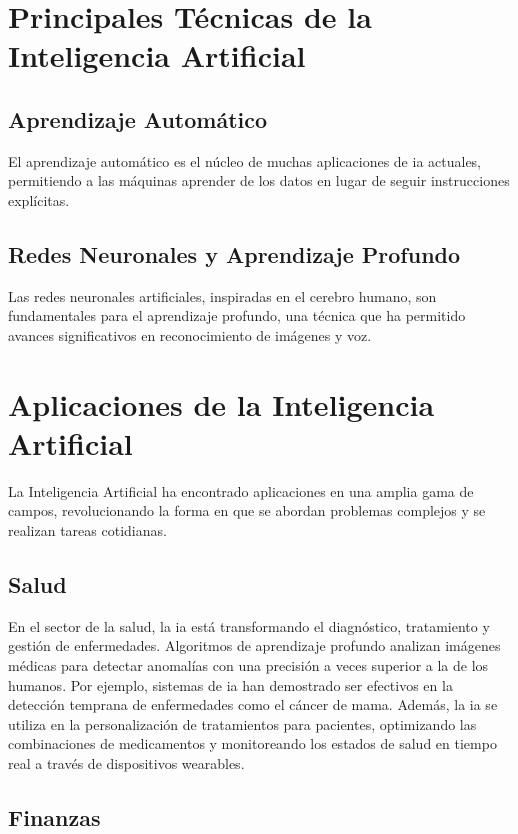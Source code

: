 \section{Principales Técnicas de la Inteligencia Artificial}

\subsection{Aprendizaje Automático}

El aprendizaje automático es el núcleo de muchas aplicaciones de \acrshort{ia} actuales, permitiendo a las máquinas aprender de los datos en lugar de seguir instrucciones explícitas.

\subsection{Redes Neuronales y Aprendizaje Profundo}

Las redes neuronales artificiales, inspiradas en el cerebro humano, son fundamentales para el aprendizaje profundo, una técnica que ha permitido avances significativos en reconocimiento de imágenes y voz.

\section{Aplicaciones de la Inteligencia Artificial}

La Inteligencia Artificial ha encontrado aplicaciones en una amplia gama de campos, revolucionando la forma en que se abordan problemas complejos y se realizan tareas cotidianas.

\subsection{Salud}

En el sector de la salud, la \acrshort{ia} está transformando el diagnóstico, tratamiento y gestión de enfermedades. Algoritmos de aprendizaje profundo analizan imágenes médicas para detectar anomalías con una precisión a veces superior a la de los humanos. Por ejemplo, sistemas de \acrshort{ia} han demostrado ser efectivos en la detección temprana de enfermedades como el cáncer de mama. Además, la \acrshort{ia} se utiliza en la personalización de tratamientos para pacientes, optimizando las combinaciones de medicamentos y monitoreando los estados de salud en tiempo real a través de dispositivos wearables.

\subsection{Finanzas}

